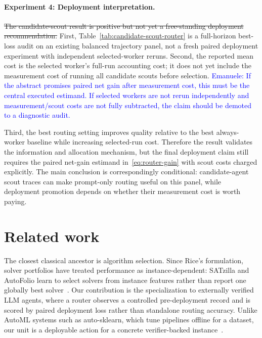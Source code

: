 \documentclass{article}
\newcounter{algorithm}
\begin{document}
\paragraph{Experiment 4: Deployment interpretation.}
\sout{The candidate-scout result is positive but not yet a free-standing deployment recommendation.}
First, Table~\ref{tab:candidate-scout-router} is a full-horizon best-loss audit on an existing balanced trajectory panel, not a fresh paired deployment experiment with independent selected-worker reruns.
Second, the reported mean cost is the selected worker's full-run accounting cost; it does not yet include the measurement cost of running all candidate scouts before selection.
\textcolor{blue}{Emanuele: If the abstract promises paired net gain after measurement cost, this must be the central executed estimand. If selected workers are not rerun independently and measurement/scout costs are not fully subtracted, the claim should be demoted to a diagnostic audit.}

Third, the best routing setting improves quality relative to the best always-worker baseline while increasing selected-run cost.
Therefore the result validates the information and allocation mechanism, but the final deployment claim still requires the paired net-gain estimand in~\eqref{eq:router-gain} with scout costs charged explicitly.
The main conclusion is correspondingly conditional: candidate-agent scout traces can make prompt-only routing useful on this panel, while deployment promotion depends on whether their measurement cost is worth paying.



\section{Related work}
\label{sec:related}

The closest classical ancestor is algorithm selection.
Since Rice's formulation, solver portfolios have treated performance as instance-dependent: SATzilla and AutoFolio learn to select solvers from instance features rather than report one globally best solver~\citep{rice1976algorithm,xu2012satzilla,lindauer2015autofolio,kotthoff2016algorithm}.
Our contribution is the specialization to externally verified LLM agents, where a router observes a controlled pre-deployment record and is scored by paired deployment loss rather than standalone routing accuracy.
Unlike AutoML systems such as auto-sklearn, which tune pipelines offline for a dataset, our unit is a deployable action for a concrete verifier-backed instance~\citep{feurer2015autosklearn}.
\end{document}
